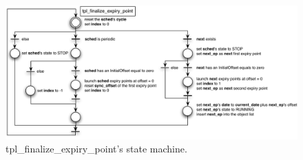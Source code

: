 \begin{figure}[H] %
   \centering
   \includegraphics[width=7in]{pictures/STprocessingTplFinalize.pdf}  
   \caption{tpl_finalize_expiry_point's state machine.}
   \label{fig:STprocessingTplFinalize}
\end{figure} 
















